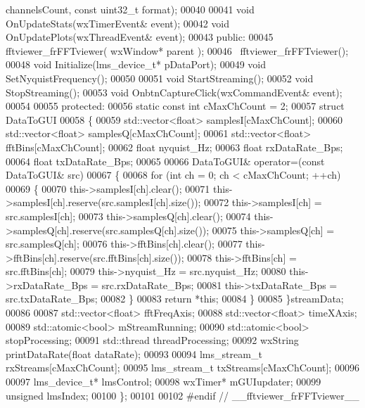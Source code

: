 \begin{DoxyCode}
      channelsCount, \textcolor{keyword}{const} uint32\_t format);
00040 
00041     \textcolor{keywordtype}{void} OnUpdateStats(wxTimerEvent& event);
00042     \textcolor{keywordtype}{void} OnUpdatePlots(wxThreadEvent& event);
00043 \textcolor{keyword}{public}:
00045     fftviewer_frFFTviewer( wxWindow* parent );
00046     ~fftviewer_frFFTviewer();
00048     \textcolor{keywordtype}{void} Initialize(lms_device_t* pDataPort);
00049     \textcolor{keywordtype}{void} SetNyquistFrequency();
00050 
00051     \textcolor{keywordtype}{void} StartStreaming();
00052     \textcolor{keywordtype}{void} StopStreaming();
00053     \textcolor{keywordtype}{void} OnbtnCaptureClick(wxCommandEvent& event);
00054 
00055 \textcolor{keyword}{protected}:
00056     \textcolor{keyword}{static} \textcolor{keyword}{const} \textcolor{keywordtype}{int} cMaxChCount = 2;
00057     \textcolor{keyword}{struct }DataToGUI
00058     \{
00059         std::vector<float> samplesI[cMaxChCount];
00060         std::vector<float> samplesQ[cMaxChCount];
00061         std::vector<float> fftBins[cMaxChCount];
00062         \textcolor{keywordtype}{float} nyquist_Hz;
00063         \textcolor{keywordtype}{float} rxDataRate_Bps;
00064         \textcolor{keywordtype}{float} txDataRate_Bps;
00065 
00066         DataToGUI& operator=(\textcolor{keyword}{const} DataToGUI& src)
00067         \{
00068             \textcolor{keywordflow}{for} (\textcolor{keywordtype}{int} ch = 0; ch < cMaxChCount; ++ch)
00069             \{
00070                 this->samplesI[ch].clear();
00071                 this->samplesI[ch].reserve(src.samplesI[ch].size());
00072                 this->samplesI[ch] = src.samplesI[ch];
00073                 this->samplesQ[ch].clear();
00074                 this->samplesQ[ch].reserve(src.samplesQ[ch].size());
00075                 this->samplesQ[ch] = src.samplesQ[ch];
00076                 this->fftBins[ch].clear();
00077                 this->fftBins[ch].reserve(src.fftBins[ch].size());
00078                 this->fftBins[ch] = src.fftBins[ch];
00079                 this->nyquist\_Hz = src.nyquist_Hz;
00080                 this->rxDataRate\_Bps = src.rxDataRate_Bps;
00081                 this->txDataRate\_Bps = src.txDataRate_Bps;
00082             \}
00083             \textcolor{keywordflow}{return} *\textcolor{keyword}{this};
00084         \}
00085     \}streamData;
00086 
00087     std::vector<float> fftFreqAxis;
00088     std::vector<float> timeXAxis;
00089     std::atomic<bool> mStreamRunning;
00090     std::atomic<bool> stopProcessing;
00091     std::thread threadProcessing;
00092     wxString printDataRate(\textcolor{keywordtype}{float} dataRate);
00093 
00094     lms_stream_t rxStreams[cMaxChCount];
00095     lms_stream_t txStreams[cMaxChCount];
00096 
00097     lms_device_t* lmsControl;
00098     wxTimer* mGUIupdater;
00099     \textcolor{keywordtype}{unsigned} lmsIndex;
00100 \};
00101 
00102 \textcolor{preprocessor}{#endif // \_\_fftviewer\_frFFTviewer\_\_}
\end{DoxyCode}
